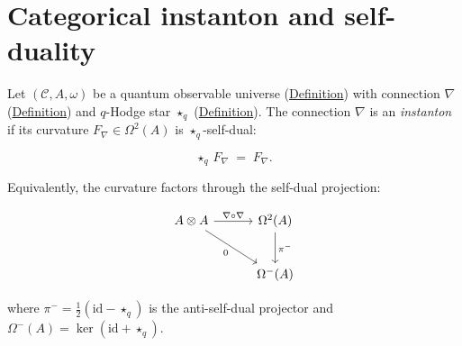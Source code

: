 \section{Categorical instanton and self-duality}
\label{sec:instanton}

\begin{definition}
  \label{def:categorical-instanton}
Let $(\mathcal{C}, A, \omega)$ be a quantum observable universe
(\hyperref[def:quantum-observable-universe]{Definition}) with connection
$\nabla$ (\hyperref[def:categorical-connection]{Definition}) and
$q$-Hodge star $\star_q$ (\hyperref[def:q-hodge-star]{Definition}).
The connection $\nabla$ is an \emph{instanton} if its curvature
$F_\nabla \in \Omega^2(A)$ is $\star_q$-self-dual:

\[
\star_q\, F_\nabla \;=\; F_\nabla.
\]

Equivalently, the curvature factors through the self-dual projection:

\begin{equation}\label{eq:instanton-cd}
\begin{tikzcd}[row sep=2.5em, column sep=3em]
  A \otimes A \ar[r, "\nabla \circ \nabla"]
    \ar[dr, "0"']
  & \Omega^2(A) \ar[d, "\pi^-"] \\
  & \Omega^-(A)
\end{tikzcd}
\end{equation}

where $\pi^- = \tfrac{1}{2}(\mathrm{id} - \star_q)$ is the
anti-self-dual projector and $\Omega^-(A) = \ker(\mathrm{id} + \star_q)$.
\end{definition}

